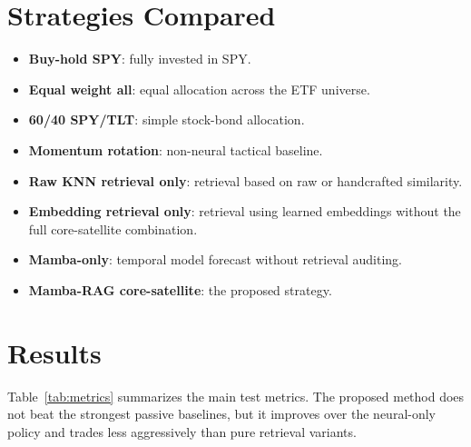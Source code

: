 \documentclass[11pt]{article}
\begin{document}
\section{Strategies Compared}
\begin{itemize}
    \item \textbf{Buy-hold SPY}: fully invested in SPY.
    \item \textbf{Equal weight all}: equal allocation across the ETF universe.
    \item \textbf{60/40 SPY/TLT}: simple stock-bond allocation.
    \item \textbf{Momentum rotation}: non-neural tactical baseline.
    \item \textbf{Raw KNN retrieval only}: retrieval based on raw or handcrafted similarity.
    \item \textbf{Embedding retrieval only}: retrieval using learned embeddings without the full core-satellite combination.
    \item \textbf{Mamba-only}: temporal model forecast without retrieval auditing.
    \item \textbf{Mamba-RAG core-satellite}: the proposed strategy.
\end{itemize}

\section{Results}
Table~\ref{tab:metrics} summarizes the main test metrics. The proposed method does not beat the strongest passive baselines, but it improves over the neural-only policy and trades less aggressively than pure retrieval variants.
\end{document}
